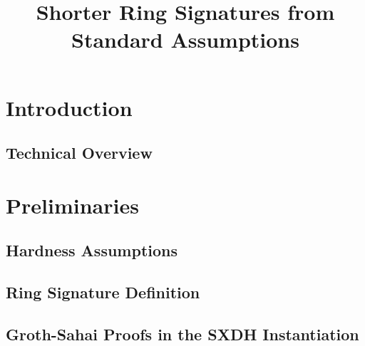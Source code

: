 \documentclass{llncs}
\title{Shorter Ring Signatures from Standard Assumptions}
\begin{document}
\maketitle

\begin{abstract}
    
\end{abstract} 

%

\section{Introduction}

     

   \subsection{Technical Overview} \label{sec:tech-overview}

	


    	



\section{Preliminaries}

	

	\subsection{Hardness Assumptions} \label{sec:hardness-ass}

	

		\subsection{Ring Signature Definition}
    
            		

	\subsection{Groth-Sahai Proofs in the SXDH Instantiation} \label{sec:gs-proofs}
\end{document}
